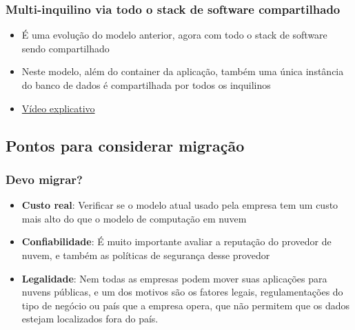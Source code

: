 \begin{frame}
	\frametitle{Multi-inquilino via todo o stack de software compartilhado}
	\begin{itemize}
		\item É uma evolução do modelo anterior, agora com todo o stack de software sendo compartilhado
		\item Neste modelo, além do container da aplicação, também uma única instância do banco de dados é compartilhada por todos os inquilinos
		\item \href{https://www.youtube.com/watch?v=S9_K1jwjo1U}{Vídeo explicativo}
	\end{itemize}
\end{frame}

\subsection{Pontos para considerar migração}

\begin{frame}
	\frametitle{Devo migrar?}
	\begin{itemize}
		\item \textbf{Custo real}: Verificar se o modelo atual usado pela empresa tem um custo mais alto do que o modelo de computação em nuvem
		\item \textbf{Confiabilidade}: É muito importante avaliar a reputação do provedor de nuvem, e também as políticas de segurança desse provedor
		\item \textbf{Legalidade}: Nem todas as empresas podem mover suas aplicações para nuvens públicas, e um dos motivos são os fatores legais, regulamentações do tipo de negócio ou país que a empresa opera, que não permitem que os dados estejam localizados fora do país.
	\end{itemize}
\end{frame}

